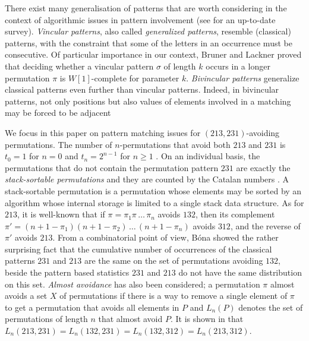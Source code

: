 \documentclass[a4paper]{llncs}
\newcounter{num}
\begin{document}
	There exist many generalisation of patterns that are worth considering
	in the context of algorithmic issues in pattern involvement
	(see \cite{Kitaev:book:2011} for an up-to-date survey).
	\emph{Vincular patterns}, also called
	\emph{generalized patterns},
	resemble (classical) patterns, with the constraint that some of the letters in
	an occurrence must be consecutive.
	Of particular importance in our context,
	Bruner and Lackner \cite{Bruner:Lackner:SWAT:2012}
	proved that deciding whether a vincular pattern
	$\sigma$ of length $k$ occurs in a longer permutation
	$\pi$ is $W[1]$-complete for
	parameter $k$.
	\emph{Bivincular patterns} generalize classical patterns even further
	than vincular
	patterns. Indeed, in bivincular patterns,
	not only positions but also values
	of elements involved in a matching may be forced to be adjacent

	We focus in this paper on pattern matching issues for
	$(213,231)$-avoiding permutations.
	The number of $n$-permutations that avoid both
	$213$ and $231$ is
	$t_0 = 1$ for $n = 0$ and
	$t_n =2^{n-1}$ for $n\geq 1$ \cite{Simion:Schmidt:EJC:1985}.
	On an individual basis,
	the permutations that do not contain the permutation pattern $231$
	are exactly the \emph{stack-sortable permutations} and they are counted by
	the Catalan numbers \cite{Knuth:1997:ACP:260999}.
	A stack-sortable permutation is a permutation whose elements may be sorted by
	an algorithm whose internal storage is limited to a single stack data structure.
	As for $213$, it is well-known that
 	if $\pi = \pi_1\pi\,\ldots\,\pi_n$ avoids $132$, then its complement
 	$\pi' = (n+1-\pi_1)(n+1-\pi_2)\,\ldots\,(n+1-\pi_n)$ avoids $312$, and
 	the reverse of $\pi'$ avoids $213$.
 	From a combinatorial point of view,
 	B\'ona \cite{Bona:ElJC:2012}
 	showed the rather surprising fact that the cumulative number of
 	occurrences of the classical patterns $231$ and $213$ are the same on the
 	set of permutations avoiding $132$,
 	beside the pattern based statistics $231$ and $213$
 	do not have the same distribution on this set.
 	\emph{Almost avoidance} has also been considered;
 	a permutation $\pi$ almost avoids a set $X$ of permutations
 	if there is a way to remove a single element of $\pi$ to get a permutation
 	that avoids all elements in $P$
 	and $L_n(P)$ denotes the set of permutations of length $n$ that almost avoid
 	$P$.
 	It is shown in \cite{Griffiths:Smith:Warren:PMA:2011} that
 	$L_n(213, 231) = L_n(132, 231) = L_n(132, 312) = L_n(213, 312)$.
\end{document}
